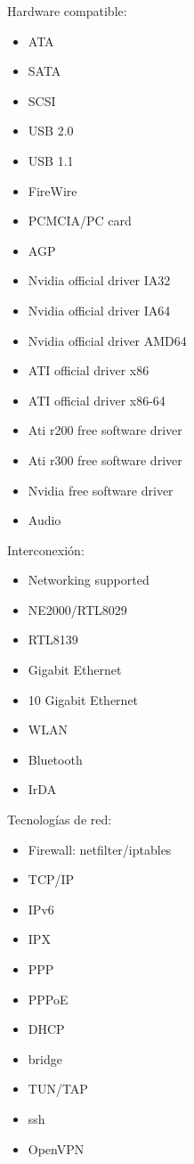 Hardware compatible:

			\begin{itemize}
				\item ATA
				\item SATA
				\item SCSI
				\item USB 2.0 	
				\item USB 1.1
				\item FireWire
				\item PCMCIA/PC card
				\item AGP
				\item Nvidia official driver IA32
				\item Nvidia official driver IA64
				\item Nvidia official driver AMD64
				\item ATI official driver x86
				\item ATI official driver x86-64
				\item Ati r200 free software driver
				\item Ati r300 free software driver
				\item Nvidia free software driver
				\item Audio
			\end{itemize}
Interconexión:

			\begin{itemize}
				\item Networking supported	
				\item NE2000/RTL8029
				\item RTL8139
				\item Gigabit Ethernet 	
				\item 10 Gigabit Ethernet
				\item WLAN
				\item Bluetooth
				\item IrDA
			\end{itemize}

Tecnologías de red:

			\begin{itemize}
				\item Firewall: netfilter/iptables
				\item TCP/IP	
				\item IPv6
				\item IPX 	
				\item PPP			
				\item PPPoE
				\item DHCP
				\item bridge
				\item TUN/TAP
				\item ssh
				\item OpenVPN
			\end{itemize}


